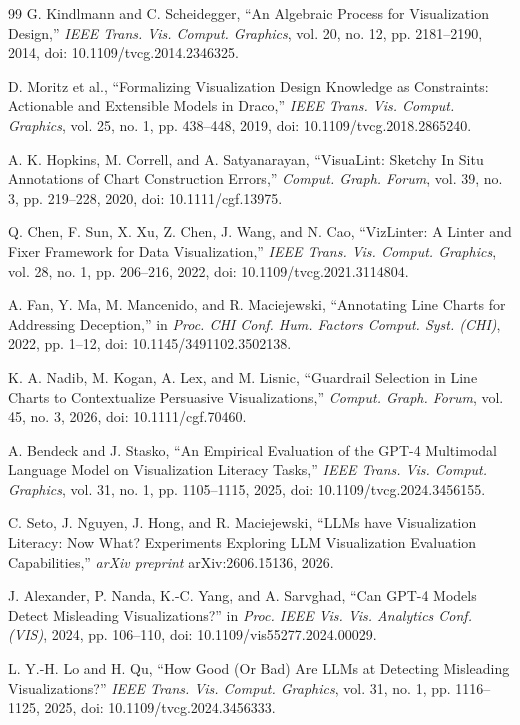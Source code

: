 \documentclass[conference]{IEEEtran}
\begin{document}
\begin{thebibliography}{99}
G. Kindlmann and C. Scheidegger, ``An Algebraic Process for Visualization Design,'' \emph{IEEE Trans. Vis. Comput. Graphics}, vol. 20, no. 12, pp. 2181--2190, 2014, doi: 10.1109/tvcg.2014.2346325.

D. Moritz et al., ``Formalizing Visualization Design Knowledge as Constraints: Actionable and Extensible Models in Draco,'' \emph{IEEE Trans. Vis. Comput. Graphics}, vol. 25, no. 1, pp. 438--448, 2019, doi: 10.1109/tvcg.2018.2865240.

A. K. Hopkins, M. Correll, and A. Satyanarayan, ``VisuaLint: Sketchy In Situ Annotations of Chart Construction Errors,'' \emph{Comput. Graph. Forum}, vol. 39, no. 3, pp. 219--228, 2020, doi: 10.1111/cgf.13975.

Q. Chen, F. Sun, X. Xu, Z. Chen, J. Wang, and N. Cao, ``VizLinter: A Linter and Fixer Framework for Data Visualization,'' \emph{IEEE Trans. Vis. Comput. Graphics}, vol. 28, no. 1, pp. 206--216, 2022, doi: 10.1109/tvcg.2021.3114804.

A. Fan, Y. Ma, M. Mancenido, and R. Maciejewski, ``Annotating Line Charts for Addressing Deception,'' in \emph{Proc. CHI Conf. Hum. Factors Comput. Syst. (CHI)}, 2022, pp. 1--12, doi: 10.1145/3491102.3502138.

K. A. Nadib, M. Kogan, A. Lex, and M. Lisnic, ``Guardrail Selection in Line Charts to Contextualize Persuasive Visualizations,'' \emph{Comput. Graph. Forum}, vol. 45, no. 3, 2026, doi: 10.1111/cgf.70460.

A. Bendeck and J. Stasko, ``An Empirical Evaluation of the GPT-4 Multimodal Language Model on Visualization Literacy Tasks,'' \emph{IEEE Trans. Vis. Comput. Graphics}, vol. 31, no. 1, pp. 1105--1115, 2025, doi: 10.1109/tvcg.2024.3456155.

C. Seto, J. Nguyen, J. Hong, and R. Maciejewski, ``LLMs have Visualization Literacy: Now What? Experiments Exploring LLM Visualization Evaluation Capabilities,'' \emph{arXiv preprint} arXiv:2606.15136, 2026.

J. Alexander, P. Nanda, K.-C. Yang, and A. Sarvghad, ``Can GPT-4 Models Detect Misleading Visualizations?'' in \emph{Proc. IEEE Vis. Vis. Analytics Conf. (VIS)}, 2024, pp. 106--110, doi: 10.1109/vis55277.2024.00029.

L. Y.-H. Lo and H. Qu, ``How Good (Or Bad) Are LLMs at Detecting Misleading Visualizations?'' \emph{IEEE Trans. Vis. Comput. Graphics}, vol. 31, no. 1, pp. 1116--1125, 2025, doi: 10.1109/tvcg.2024.3456333.


\end{thebibliography}
\end{document}
